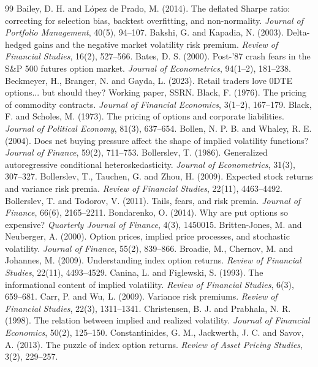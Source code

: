 \documentclass[11pt,a4paper]{article}
\begin{document}
\begin{thebibliography}{99}\small
\bibitem{} Bailey, D. H. and López de Prado, M. (2014). The deflated Sharpe ratio: correcting for selection bias, backtest overfitting, and non-normality. \emph{Journal of Portfolio Management}, 40(5), 94--107.
\bibitem{} Bakshi, G. and Kapadia, N. (2003). Delta-hedged gains and the negative market volatility risk premium. \emph{Review of Financial Studies}, 16(2), 527--566.
\bibitem{} Bates, D. S. (2000). Post-'87 crash fears in the S\&P 500 futures option market. \emph{Journal of Econometrics}, 94(1--2), 181--238.
\bibitem{} Beckmeyer, H., Branger, N. and Gayda, L. (2023). Retail traders love 0DTE options... but should they? Working paper, SSRN.
\bibitem{} Black, F. (1976). The pricing of commodity contracts. \emph{Journal of Financial Economics}, 3(1--2), 167--179.
\bibitem{} Black, F. and Scholes, M. (1973). The pricing of options and corporate liabilities. \emph{Journal of Political Economy}, 81(3), 637--654.
\bibitem{} Bollen, N. P. B. and Whaley, R. E. (2004). Does net buying pressure affect the shape of implied volatility functions? \emph{Journal of Finance}, 59(2), 711--753.
\bibitem{} Bollerslev, T. (1986). Generalized autoregressive conditional heteroskedasticity. \emph{Journal of Econometrics}, 31(3), 307--327.
\bibitem{} Bollerslev, T., Tauchen, G. and Zhou, H. (2009). Expected stock returns and variance risk premia. \emph{Review of Financial Studies}, 22(11), 4463--4492.
\bibitem{} Bollerslev, T. and Todorov, V. (2011). Tails, fears, and risk premia. \emph{Journal of Finance}, 66(6), 2165--2211.
\bibitem{} Bondarenko, O. (2014). Why are put options so expensive? \emph{Quarterly Journal of Finance}, 4(3), 1450015.
\bibitem{} Britten-Jones, M. and Neuberger, A. (2000). Option prices, implied price processes, and stochastic volatility. \emph{Journal of Finance}, 55(2), 839--866.
\bibitem{} Broadie, M., Chernov, M. and Johannes, M. (2009). Understanding index option returns. \emph{Review of Financial Studies}, 22(11), 4493--4529.
\bibitem{} Canina, L. and Figlewski, S. (1993). The informational content of implied volatility. \emph{Review of Financial Studies}, 6(3), 659--681.
\bibitem{} Carr, P. and Wu, L. (2009). Variance risk premiums. \emph{Review of Financial Studies}, 22(3), 1311--1341.
\bibitem{} Christensen, B. J. and Prabhala, N. R. (1998). The relation between implied and realized volatility. \emph{Journal of Financial Economics}, 50(2), 125--150.
\bibitem{} Constantinides, G. M., Jackwerth, J. C. and Savov, A. (2013). The puzzle of index option returns. \emph{Review of Asset Pricing Studies}, 3(2), 229--257.

\end{thebibliography}
\end{document}

